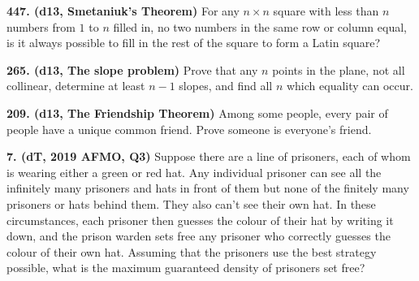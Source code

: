 \documentclass{article}
\begin{document}
\textbf{447. (\color{red}d13\color{black}, Smetaniuk's Theorem)} For any $n \times n$ square with less than $n$ numbers from $1$ to $n$ filled in, no two numbers in the same row or column equal, is it always possible to fill in the rest of the square to form a Latin square?

\textbf{265. (\color{red}d13\color{black}, The slope problem)} Prove that any $n$ points in the plane, not all collinear, determine at least $n-1$ slopes, and find all $n$ which equality can occur.

\textbf{209. (\color{red}d13\color{black}, The Friendship Theorem)} Among some people, every pair of people have a unique common friend. Prove someone is everyone's friend.



\textbf{7. (\color{red}dT\color{black}, 2019 AFMO, Q3)} Suppose there are a line of prisoners, each of whom is wearing either a green or red hat. Any individual prisoner can see all the infinitely many prisoners and hats in front of them but none of the finitely many prisoners or hats behind them. They also can't see their own hat. In these circumstances, each prisoner then guesses the colour of their hat by writing it down, and the prison warden sets free any prisoner who correctly guesses the colour of their own hat. Assuming that the prisoners use the best strategy possible, what is the maximum guaranteed density of prisoners set free?
\end{document}
